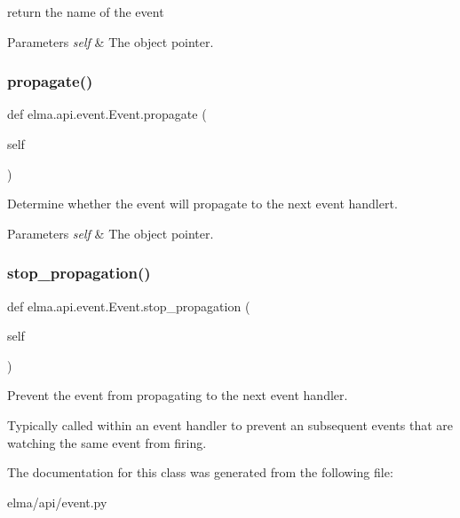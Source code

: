 return the name of the event 


\begin{DoxyParams}{Parameters}
{\em self} & The object pointer. \\
\hline
\end{DoxyParams}
\mbox{\label{classelma_1_1api_1_1event_1_1Event_a5912a8957bf49373f95a5646c861a905}} 
\subsubsection{\texorpdfstring{propagate()}{propagate()}}
{\footnotesize\ttfamily def elma.\+api.\+event.\+Event.\+propagate (\begin{DoxyParamCaption}\item[{}]{self }\end{DoxyParamCaption})}



Determine whether the event will propagate to the next event handlert. 


\begin{DoxyParams}{Parameters}
{\em self} & The object pointer. \\
\hline
\end{DoxyParams}
\mbox{\label{classelma_1_1api_1_1event_1_1Event_a2b670f52655e83d9ab9f80385f5917ff}} 
\subsubsection{\texorpdfstring{stop\+\_\+propagation()}{stop\_propagation()}}
{\footnotesize\ttfamily def elma.\+api.\+event.\+Event.\+stop\+\_\+propagation (\begin{DoxyParamCaption}\item[{}]{self }\end{DoxyParamCaption})}



Prevent the event from propagating to the next event handler. 

Typically called within an event handler to prevent an subsequent events that are watching the same event from firing. 

The documentation for this class was generated from the following file\+:\begin{DoxyCompactItemize}
\item 
elma/api/event.\+py\end{DoxyCompactItemize}
